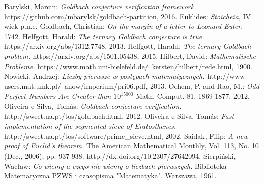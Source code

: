 \documentclass[10pt,onecolumn]{article}
\theoremstyle{definition}
\theoremstyle{hypothesis}
\theoremstyle{capability}
\begin{document}
\begin{thebibliography}{9}

  Barylski, Marcin:
  \emph{Goldbach conjecture verification framework.}
  https://github.com/mbarylsk/goldbach-partition,
  2016.
  Euklides:
  \emph{Stoicheia},
  IV wiek p.n.e.
  Goldbach, Christian:
  \emph{On the margin of a letter to Leonard Euler},
  1742.
   Helfgott, Harald:
  \emph{The ternary Goldbach conjecture is true.}
  https://arxiv.org/abs/1312.7748,
  2013.
   Helfgott, Harald:
  \emph{The ternary Goldbach problem.}
  https://arxiv.org/abs/1501.05438,
  2015.
   Hilbert, David:
  \emph{Mathematische Probleme.}
  https://www.math.uni-bielefeld.de/~kersten/hilbert/rede.html,
  1900.
   Nowicki, Andrzej:
  \emph{Liczby pierwsze w postępach matematycznych.}
  http://www-users.mat.umk.pl/~anow/imperium/pri06.pdf,
  2013.
  Ochem, P. and Rao, M.:
  \emph{Odd Perfect Numbers Are Greater than $10^{15000}$}
   Math. Comput. 81, 1869-1877,
   2012.
   Oliveira e Silva, Tomás:
  \emph{Goldbach conjecture verification.}
  http://sweet.ua.pt/tos/goldbach.html,
  2012.
  Oliveira e Silva, Tomás:
  \emph{Fast implementation of the segmented sieve of Eratosthenes.}
  http://sweet.ua.pt/tos/software/prime\_sieve.html,
  2002.
  Saidak, Filip: 
  \emph{A new proof of Euclid's theorem.}
  The American Mathematical Monthly, Vol. 113, No. 10 (Dec., 2006), pp. 937-938. http://dx.doi.org/10.2307/27642094.
  Sierpiński, Wacław: 
  \emph{Co wiemy a czego nie wiemy o liczbach pierwszych.}
  Biblioteka Matematyczna PZWS i czasopisma "Matematyka". Warszawa, 1961.

\end{thebibliography}
\end{document}
